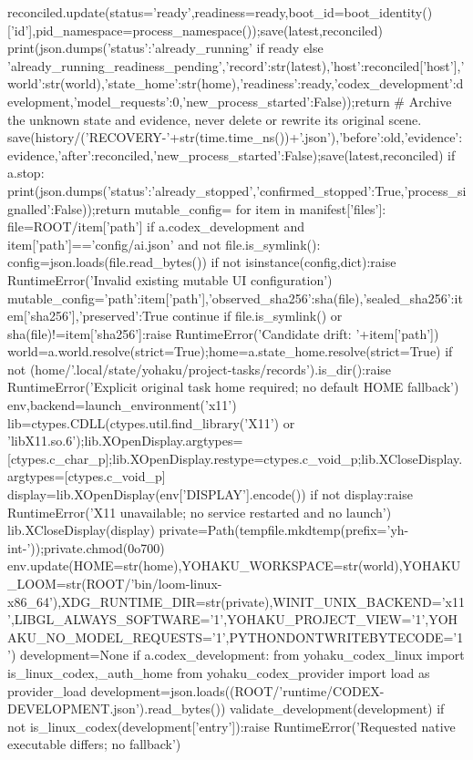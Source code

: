     reconciled.update(status='ready',readiness=ready,boot_id=boot_identity()['id'],pid_namespace=process_namespace());save(latest,reconciled)
   print(json.dumps({'status':'already_running' if ready else 'already_running_readiness_pending','record':str(latest),'host':reconciled['host'],'world':str(world),'state_home':str(home),'readiness':ready,'codex_development':development,'model_requests':0,'new_process_started':False}));return
  # Archive the unknown state and evidence, never delete or rewrite its original scene.
  save(history/('RECOVERY-'+str(time.time_ns())+'.json'),{'before':old,'evidence':evidence,'after':reconciled,'new_process_started':False});save(latest,reconciled)
 if a.stop:
  print(json.dumps({'status':'already_stopped','confirmed_stopped':True,'process_signalled':False}));return
 mutable_config={}
 for item in manifest['files']:
  file=ROOT/item['path']
  if a.codex_development and item['path']=='config/ai.json' and not file.is_symlink():
   config=json.loads(file.read_bytes())
   if not isinstance(config,dict):raise RuntimeError('Invalid existing mutable UI configuration')
   mutable_config={'path':item['path'],'observed_sha256':sha(file),'sealed_sha256':item['sha256'],'preserved':True}
   continue
  if file.is_symlink() or sha(file)!=item['sha256']:raise RuntimeError('Candidate drift: '+item['path'])
 world=a.world.resolve(strict=True);home=a.state_home.resolve(strict=True)
 if not (home/'.local/state/yohaku/project-tasks/records').is_dir():raise RuntimeError('Explicit original task home required; no default HOME fallback')
 env,backend=launch_environment('x11')
 lib=ctypes.CDLL(ctypes.util.find_library('X11') or 'libX11.so.6');lib.XOpenDisplay.argtypes=[ctypes.c_char_p];lib.XOpenDisplay.restype=ctypes.c_void_p;lib.XCloseDisplay.argtypes=[ctypes.c_void_p]
 display=lib.XOpenDisplay(env['DISPLAY'].encode())
 if not display:raise RuntimeError('X11 unavailable; no service restarted and no launch')
 lib.XCloseDisplay(display)
 private=Path(tempfile.mkdtemp(prefix='yh-int-'));private.chmod(0o700)
 env.update(HOME=str(home),YOHAKU_WORKSPACE=str(world),YOHAKU_LOOM=str(ROOT/'bin/loom-linux-x86_64'),XDG_RUNTIME_DIR=str(private),WINIT_UNIX_BACKEND='x11',LIBGL_ALWAYS_SOFTWARE='1',YOHAKU_PROJECT_VIEW='1',YOHAKU_NO_MODEL_REQUESTS='1',PYTHONDONTWRITEBYTECODE='1')
 development=None
 if a.codex_development:
  from yohaku_codex_linux import is_linux_codex,_auth_home
  from yohaku_codex_provider import load as provider_load
  development=json.loads((ROOT/'runtime/CODEX-DEVELOPMENT.json').read_bytes())
  validate_development(development)
  if not is_linux_codex(development['entry']):raise RuntimeError('Requested native executable differs; no fallback')
